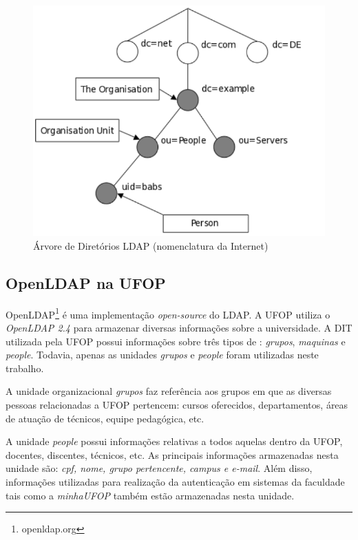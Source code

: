 \documentclass[
  12pt,       %
  openright,      %
  oneside,      %
  a4paper,      %
  english,      %
  french,        %
  spanish,     %
  brazil        %
  ]{abntex2-decsi}
\begin{document}
        \begin{figure}[h]
           \centering
           \caption{Árvore de Diretórios LDAP (nomenclatura da Internet)}\label{fig:ldap_tree}
           \includegraphics[scale=0.6]{img/ldap_tree}
        \end{figure}

        \subsection{OpenLDAP na UFOP}

        OpenLDAP\footnote{openldap.org} é uma implementação \textit{open-source} do LDAP. A UFOP utiliza o \textit{OpenLDAP 2.4} para armazenar diversas informações sobre a universidade. A DIT utilizada pela UFOP possui informações sobre três tipos de : \textit{grupos}, \textit{maquinas} e \textit{people}. Todavia, apenas as unidades \textit{grupos} e \textit{people} foram utilizadas neste trabalho.

        A unidade organizacional \textit{grupos} faz referência aos grupos em que as diversas pessoas relacionadas a UFOP pertencem: cursos oferecidos, departamentos, áreas de atuação de técnicos, equipe pedagógica, etc. 

        A unidade \textit{people} possui informações relativas a todos aquelas dentro da UFOP, docentes, discentes, técnicos, etc. As principais informações armazenadas nesta unidade são: \textit{cpf, nome, grupo pertencente, campus e e-mail}. Além disso, informações utilizadas para realização da autenticação em sistemas da faculdade tais como a \textit{minhaUFOP} também estão armazenadas nesta unidade.
\end{document}
